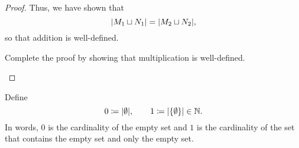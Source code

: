\begin{dfn}
\begin{prp}
\begin{proof}
Thus, we have shown that
\begin{equation}
\lvert M_1\sqcup N_1\rvert=\lvert M_2\sqcup N_2\rvert,
\end{equation}
so that addition is well-defined.

\begin{exr}
Complete the proof by showing that multiplication is well-defined.
\end{exr}
\end{proof}
\end{prp}
\end{dfn}

\begin{dfn}[$0$ and $1$]
Define
\begin{equation}
0\coloneqq \lvert\emptyset\rvert,\qquad 1\coloneqq \lvert\{ \emptyset \}\rvert\in \mathbb{N} .
\end{equation}
In words, $0$ is the cardinality of the empty set and $1$ is the cardinality of the set that contains the empty set and only the empty set.
\end{dfn}
